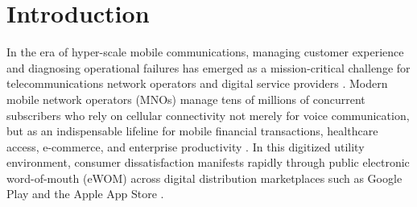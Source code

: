 \documentclass[review,12pt,authoryear]{elsarticle}
\begin{document}
\section{Introduction}
\label{sec:introduction}

In the era of hyper-scale mobile communications, managing customer experience and diagnosing operational failures has emerged as a mission-critical challenge for telecommunications network operators and digital service providers \citep{liao2005expert, sutherland2014role}. Modern mobile network operators (MNOs) manage tens of millions of concurrent subscribers who rely on cellular connectivity not merely for voice communication, but as an indispensable lifeline for mobile financial transactions, healthcare access, e-commerce, and enterprise productivity \citep{gsma2024mobile, itu2024measuring}. In this digitized utility environment, consumer dissatisfaction manifests rapidly through public electronic word-of-mouth (eWOM) across digital distribution marketplaces such as Google Play and the Apple App Store \citep{dellarocas2003digitization, hennig2004electronic}.
\end{document}
